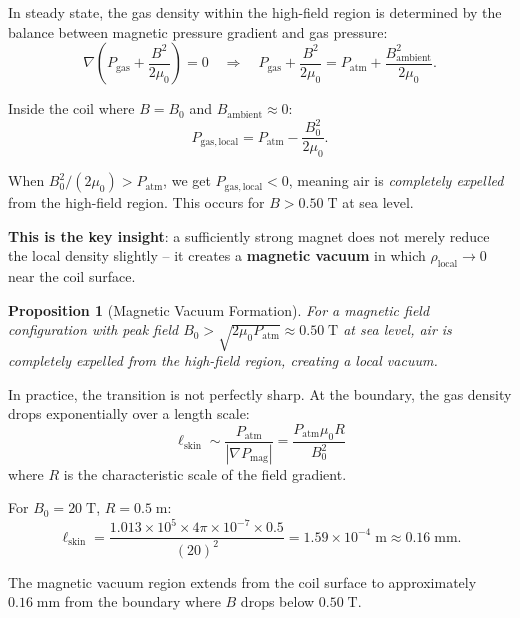 \documentclass[11pt,a4paper]{article}
\newtheorem{proposition}{Proposition}
\begin{document}
In steady state, the gas density within the high-field region is determined by the
balance between magnetic pressure gradient and gas pressure:
\begin{equation}
\nabla\!\left(P_{\mathrm{gas}} + \frac{B^2}{2\mu_0}\right) = 0
\quad\Longrightarrow\quad
P_{\mathrm{gas}} + \frac{B^2}{2\mu_0} = P_{\mathrm{atm}} + \frac{B_{\mathrm{ambient}}^2}{2\mu_0}.
\end{equation}

Inside the coil where $B = B_0$ and $B_{\mathrm{ambient}} \approx 0$:
\begin{equation}
P_{\mathrm{gas,local}} = P_{\mathrm{atm}} - \frac{B_0^2}{2\mu_0}.
\end{equation}

When $B_0^2/(2\mu_0) > P_{\mathrm{atm}}$, we get $P_{\mathrm{gas,local}} < 0$,
meaning air is \emph{completely expelled} from the high-field region. This occurs
for $B > 0.50\;\mathrm{T}$ at sea level.

\textbf{This is the key insight}: a sufficiently strong magnet does not merely
reduce the local density slightly -- it creates a \textbf{magnetic vacuum} in which
$\rho_{\mathrm{local}} \to 0$ near the coil surface.

\begin{proposition}[Magnetic Vacuum Formation]\label{prop:magvac}
For a magnetic field configuration with peak field $B_0 > \sqrt{2\mu_0 P_{\mathrm{atm}}}
\approx 0.50\;\mathrm{T}$ at sea level, air is completely expelled from the
high-field region, creating a local vacuum.
\end{proposition}

In practice, the transition is not perfectly sharp. At the boundary, the gas density
drops exponentially over a length scale:
\begin{equation}
\ell_{\mathrm{skin}} \sim \frac{P_{\mathrm{atm}}}{|\nabla P_{\mathrm{mag}}|}
= \frac{P_{\mathrm{atm}} \mu_0 R}{B_0^2}
\end{equation}
where $R$ is the characteristic scale of the field gradient.

For $B_0 = 20\;\mathrm{T}$, $R = 0.5\;\mathrm{m}$:
\begin{equation}
\ell_{\mathrm{skin}} = \frac{1.013 \times 10^5 \times 4\pi \times 10^{-7} \times 0.5}{(20)^2}
= 1.59 \times 10^{-4}\;\mathrm{m} \approx 0.16\;\mathrm{mm}.
\end{equation}

The magnetic vacuum region extends from the coil surface to approximately $0.16\;\mathrm{mm}$
from the boundary where $B$ drops below $0.50\;\mathrm{T}$.
\end{document}
